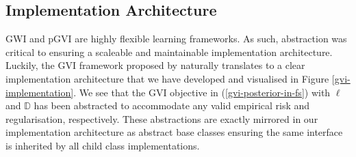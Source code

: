 \documentclass{article}
\numberwithin{equation}{section}
\begin{document}
\subsection{Implementation Architecture}\label{implementation-architecture}
GWI and pGVI are highly flexible learning frameworks. As such, abstraction was critical to ensuring a scaleable and maintainable implementation architecture. 
Luckily, the GVI framework proposed by \cite{knoblauch2022optimization} naturally translates to a clear implementation architecture that we have developed and visualised in Figure \ref{gvi-implementation}.
We see that the GVI objective in (\ref{gvi-posterior-in-fs}) with $\ell$ and $\mathbb{D}$ has been abstracted to accommodate any valid empirical risk and regularisation, respectively. 
These abstractions are exactly mirrored in our implementation architecture as abstract base classes ensuring the same interface is inherited by all child class implementations. 
\end{document}
